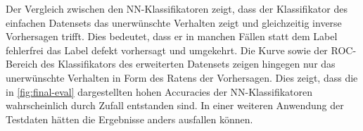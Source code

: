 Der Vergleich zwischen den NN-Klassifikatoren zeigt, dass der Klassifikator des einfachen Datensets das unerwünschte Verhalten zeigt und gleichzeitig inverse Vorhersagen trifft. Dies bedeutet, dass er in manchen Fällen statt dem Label \glqq fehlerfrei\grqq{} das Label \glqq defekt\grqq{} vorhersagt und umgekehrt. Die Kurve sowie der ROC-Bereich des Klassifikators des erweiterten Datensets zeigen hingegen nur das unerwünschte Verhalten in Form des \glqq Ratens\grqq{} der Vorhersagen. Dies zeigt, dass die in \autoref{fig:final-eval} dargestellten hohen Accuracies der NN-Klassifikatoren wahrscheinlich durch Zufall entstanden sind. In einer weiteren Anwendung der Testdaten hätten die Ergebnisse anders ausfallen können.

\begin{figure}[ht]
  \centering
  \qquad

\end{figure}
